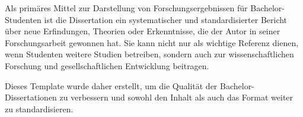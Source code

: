 Als prim\"ares Mittel zur Darstellung von Forschungsergebnissen f\"ur
Bachelor-Studenten ist die Dissertation ein systematischer und standardisierter
Bericht \"uber neue Erfindungen, Theorien oder Erkenntnisse, die der Autor in
seiner Forschungsarbeit gewonnen hat. Sie kann nicht nur als wichtige Referenz
dienen, wenn Studenten weitere Studien betreiben, sondern auch zur
wissenschaftlichen Forschung und gesellschaftlichen Entwicklung beitragen.

Dieses Template wurde daher erstellt, um die Qualit\"at der
Bachelor-Dissertationen zu verbessern und sowohl den Inhalt als auch das
Format weiter zu standardisieren.